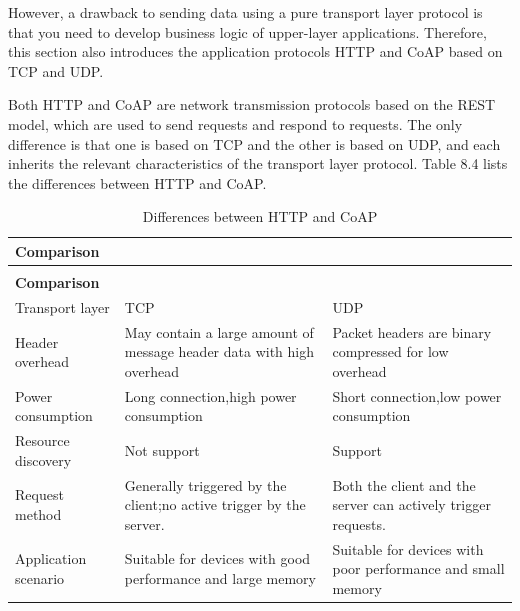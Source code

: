 \documentclass[a4paper,12pt,openany]{book}
\renewcommand{\arraystretch}{1}
\begin{document}
However, a drawback to sending data using a pure transport layer protocol is that you need to develop business logic of upper-layer applications. Therefore, this section also introduces the application protocols HTTP and CoAP based on TCP and UDP.

Both HTTP and CoAP are network transmission protocols based on the REST model, which are used to send requests and respond to requests. The only difference is that one is based on TCP and the other is based on UDP, and each inherits the relevant characteristics of the transport layer protocol. Table 8.4 lists the differences between HTTP and CoAP.

{\renewcommand{\arraystretch}{1.2}
\begin{longtable}{|>{\Centering}m{6em}|>{\RaggedRight}m{16em}|>{\RaggedRight}m{16em}|}
    \caption{Differences between HTTP and CoAP \label{8.4}} \\
        
    \hline
    \rowcolor{LightBlue} \textbf{Comparison}&\multicolumn{1}{c|}{\textbf{HTTP}}&\multicolumn{1}{c|}{\textbf{CoAP}}\\
    \hline
    \endfirsthead

    \multicolumn{3}{r}{Continuation of Table \ref{8.4}}\\
    \hline
    \rowcolor{LightBlue} \textbf{Comparison}&\multicolumn{1}{c|}{\textbf{HTTP}}&\multicolumn{1}{c|}{\textbf{CoAP}}\\
    \hline
    \endhead
        
    Transport layer&TCP&UDP\\
    \hline
    Header overhead&May contain a large amount of message header data with high overhead&Packet headers are binary compressed for low overhead\\
    \hline
    Power consumption&Long connection,\newline high power consumption&Short connection,\newline low power consumption\\
    \hline
    Resource discovery&Not support&Support\\
    \hline
    Request method&Generally triggered by the client;\newline no active trigger by the server.&Both the client and the server can actively trigger requests.\\
    \hline
    Application scenario&Suitable for devices with good performance and large memory&Suitable for devices with poor performance and small memory\\
    \hline
\end{longtable}
}
\end{document}
